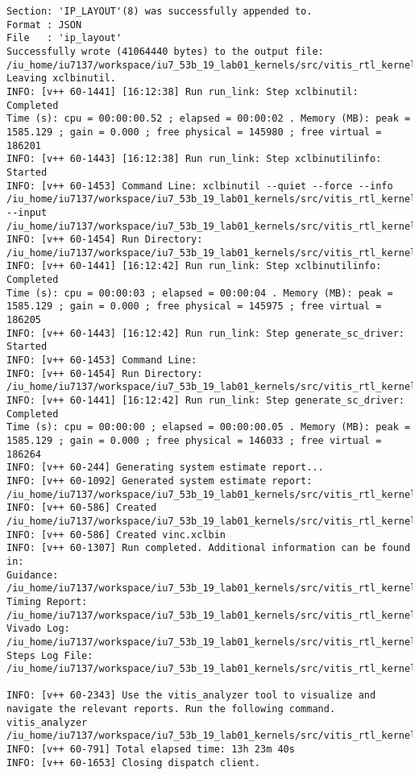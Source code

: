 \begin{center}
\begin{lstlisting}[label=lst:vlog,caption=Файл v++\_vinc.log]
Section: 'IP_LAYOUT'(8) was successfully appended to.
Format : JSON
File   : 'ip_layout'
Successfully wrote (41064440 bytes) to the output file: /iu_home/iu7137/workspace/iu7_53b_19_lab01_kernels/src/vitis_rtl_kernel/rtl_kernel_wizard_1/vinc.xclbin
Leaving xclbinutil.
INFO: [v++ 60-1441] [16:12:38] Run run_link: Step xclbinutil: Completed
Time (s): cpu = 00:00:00.52 ; elapsed = 00:00:02 . Memory (MB): peak = 1585.129 ; gain = 0.000 ; free physical = 145980 ; free virtual = 186201
INFO: [v++ 60-1443] [16:12:38] Run run_link: Step xclbinutilinfo: Started
INFO: [v++ 60-1453] Command Line: xclbinutil --quiet --force --info /iu_home/iu7137/workspace/iu7_53b_19_lab01_kernels/src/vitis_rtl_kernel/rtl_kernel_wizard_1/vinc.xclbin.info --input /iu_home/iu7137/workspace/iu7_53b_19_lab01_kernels/src/vitis_rtl_kernel/rtl_kernel_wizard_1/vinc.xclbin
INFO: [v++ 60-1454] Run Directory: /iu_home/iu7137/workspace/iu7_53b_19_lab01_kernels/src/vitis_rtl_kernel/rtl_kernel_wizard_1/_x/link/run_link
INFO: [v++ 60-1441] [16:12:42] Run run_link: Step xclbinutilinfo: Completed
Time (s): cpu = 00:00:03 ; elapsed = 00:00:04 . Memory (MB): peak = 1585.129 ; gain = 0.000 ; free physical = 145975 ; free virtual = 186205
INFO: [v++ 60-1443] [16:12:42] Run run_link: Step generate_sc_driver: Started
INFO: [v++ 60-1453] Command Line: 
INFO: [v++ 60-1454] Run Directory: /iu_home/iu7137/workspace/iu7_53b_19_lab01_kernels/src/vitis_rtl_kernel/rtl_kernel_wizard_1/_x/link/run_link
INFO: [v++ 60-1441] [16:12:42] Run run_link: Step generate_sc_driver: Completed
Time (s): cpu = 00:00:00 ; elapsed = 00:00:00.05 . Memory (MB): peak = 1585.129 ; gain = 0.000 ; free physical = 146033 ; free virtual = 186264
INFO: [v++ 60-244] Generating system estimate report...
INFO: [v++ 60-1092] Generated system estimate report: /iu_home/iu7137/workspace/iu7_53b_19_lab01_kernels/src/vitis_rtl_kernel/rtl_kernel_wizard_1/_x/reports/link/system_estimate_vinc.xtxt
INFO: [v++ 60-586] Created /iu_home/iu7137/workspace/iu7_53b_19_lab01_kernels/src/vitis_rtl_kernel/rtl_kernel_wizard_1/vinc.ltx
INFO: [v++ 60-586] Created vinc.xclbin
INFO: [v++ 60-1307] Run completed. Additional information can be found in:
Guidance: /iu_home/iu7137/workspace/iu7_53b_19_lab01_kernels/src/vitis_rtl_kernel/rtl_kernel_wizard_1/_x/reports/link/v++_link_vinc_guidance.html
Timing Report: /iu_home/iu7137/workspace/iu7_53b_19_lab01_kernels/src/vitis_rtl_kernel/rtl_kernel_wizard_1/_x/reports/link/imp/impl_1_xilinx_u200_xdma_201830_2_bb_locked_timing_summary_routed.rpt
Vivado Log: /iu_home/iu7137/workspace/iu7_53b_19_lab01_kernels/src/vitis_rtl_kernel/rtl_kernel_wizard_1/_x/logs/link/vivado.log
Steps Log File: /iu_home/iu7137/workspace/iu7_53b_19_lab01_kernels/src/vitis_rtl_kernel/rtl_kernel_wizard_1/_x/logs/link/link.steps.log

INFO: [v++ 60-2343] Use the vitis_analyzer tool to visualize and navigate the relevant reports. Run the following command. 
vitis_analyzer /iu_home/iu7137/workspace/iu7_53b_19_lab01_kernels/src/vitis_rtl_kernel/rtl_kernel_wizard_1/vinc.xclbin.link_summary 
INFO: [v++ 60-791] Total elapsed time: 13h 23m 40s
INFO: [v++ 60-1653] Closing dispatch client.
\end{lstlisting}
\end{center}

